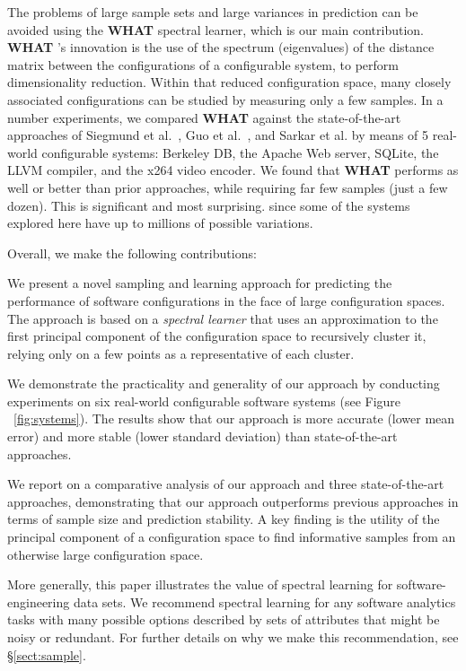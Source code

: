 \documentclass{sig-alternative}
\newcommand{\tion}[1]{\S\ref{sect:#1}}
\newcommand{\what}{{\bf WHAT }}
\begin{document}
The problems of large sample sets and large variances in prediction can be avoided using the \what spectral learner, which is our main contribution.  
{\what}'s innovation is  the use of the spectrum (eigenvalues) of the distance matrix
between the configurations of a configurable system, to perform dimensionality reduction. Within that
reduced configuration space, many closely associated configurations can be studied
by measuring only a few samples.
In a number experiments, we compared \what against the state-of-the-art approaches of Siegmund et al.~\cite{siegmund2012predicting}, Guo et al.~\cite{guo2013variability}, and Sarkar et al. \cite{sarkar2015cost} by means of 5 real-world configurable systems: Berkeley DB,  the Apache Web server, SQLite, the LLVM compiler, and the x264 video encoder.
We found that \what performs as well or better than prior approaches,
while  requiring far few samples (just a few dozen).
This is significant and most surprising.  since some of the systems explored here have up to millions of possible variations. 

Overall, we make the following contributions:
\begin{compactitem}
\item We present a novel sampling and learning approach for predicting the performance of software configurations in the face of large configuration spaces. The approach is based on a
{\em spectral
learner} that uses an approximation to the first principal component of the configuration space to recursively cluster it, relying only on a few points as a representative of each cluster.
\item We demonstrate the practicality and generality of our approach by conducting experiments on six real-world configurable software systems (see Figure ~\ref{fig:systems}). The results show that our approach is more accurate (lower mean error) and more stable (lower standard deviation) than state-of-the-art approaches.
\item We report on a comparative analysis of our approach and three state-of-the-art approaches, demonstrating that our approach outperforms previous approaches in terms of sample size and prediction stability. A key finding is the utility of the principal component of a configuration space to  find informative samples from an otherwise large configuration space.
\end{compactitem}
More generally, this paper illustrates the value of spectral learning for software-engineering data sets. We recommend spectral learning for any software analytics
tasks with many possible options described by sets of attributes
that might be noisy or redundant. For further details on why we make this recommendation, see \tion{sample}.
\end{document}
